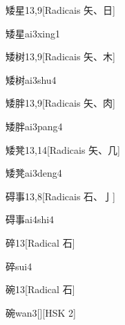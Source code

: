\begin{entry}{矮星}{13,9}[Radicais ⽮、⽇]
  \begin{phonetics}{矮星}{ai3xing1}
  \end{phonetics}
\end{entry}

\begin{entry}{矮树}{13,9}[Radicais ⽮、⽊]
  \begin{phonetics}{矮树}{ai3shu4}
  \end{phonetics}
\end{entry}

\begin{entry}{矮胖}{13,9}[Radicais ⽮、⾁]
  \begin{phonetics}{矮胖}{ai3pang4}
  \end{phonetics}
\end{entry}

\begin{entry}{矮凳}{13,14}[Radicais ⽮、⼏]
  \begin{phonetics}{矮凳}{ai3deng4}
  \end{phonetics}
\end{entry}

\begin{entry}{碍事}{13,8}[Radicais ⽯、⼅]
  \begin{phonetics}{碍事}{ai4shi4}
  \end{phonetics}
\end{entry}

\begin{entry}{碎}{13}[Radical ⽯]
  \begin{phonetics}{碎}{sui4}
  \end{phonetics}
\end{entry}

\begin{entry}{碗}{13}[Radical ⽯]
  \begin{phonetics}{碗}{wan3}[][HSK 2]
  \end{phonetics}
\end{entry}

